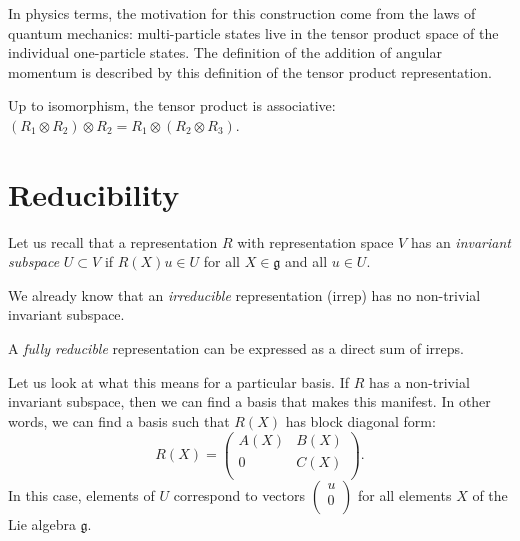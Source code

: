 \begin{leftbar}
  \begin{remark}
    In physics terms, the motivation for this construction come from the laws of quantum mechanics: multi-particle states live in the tensor product space of the individual one-particle states.
    The definition of the addition of angular momentum is described by this definition of the tensor product representation.
  \end{remark}
\end{leftbar}
\begin{leftbar}
  \begin{remark}
    Up to isomorphism, the tensor product is associative: $(R_1 \otimes R_2) \otimes R_2 = R_1 \otimes (R_2 \otimes R_3)$.
  \end{remark}
\end{leftbar}

\section{Reducibility}%
\label{sec:reducibility}

\begin{definition}[]
  Let us recall that a representation $R$ with representation space $V$ has an \emph{invariant subspace} $U \subset V$ if $R(X) u \in U$ for all $X \in \mathfrak{g}$ and all $u \in U$.
\end{definition}
We already know that an \emph{irreducible} representation (irrep) has no non-trivial invariant subspace.
\begin{definition}[]
  A \emph{fully reducible} representation can be expressed as a direct sum of irreps.
\end{definition}
Let us look at what this means for a particular basis.
If $R$ has a non-trivial invariant subspace, then we can find a basis that makes this manifest. In other words, we can find a basis such that $R(X)$ has block diagonal form:
\begin{equation}
  R(X) = 
  \begin{pmatrix}
    A(X) & B(X) \\
    0 & C(X) \\
  \end{pmatrix}.
\end{equation}
In this case, elements of $U$ correspond to vectors \(\begin{pmatrix}
u \\
0 \\
\end{pmatrix}\) for all elements $X$ of the Lie algebra $\mathfrak{g}$.

